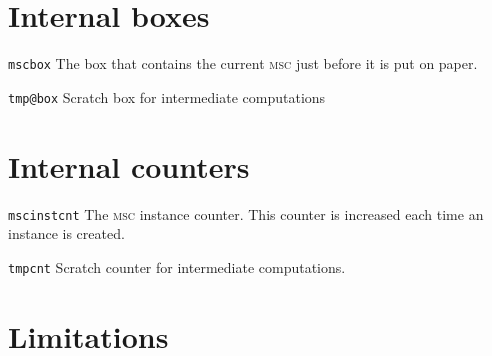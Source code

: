 \documentclass[a4paper]{article}
\newcommand{\cmd}[1]{\texttt{\bslash #1}}
\newcommand{\acro}[1]{{\scshape\lowercase{#1}}}
\newcommand\MSC{\acro{MSC}}
\newenvironment{defs}{%
  \begin{list}{}%
              {\setlength{\labelwidth}{0pt}%
               \setlength{\labelsep}{1em}%
               \setlength{\leftmargin}{1em}%
               \setlength{\parsep}{1ex}%
               \setlength{\listparindent}{0pt}%
               \setlength{\rightmargin}{0pt}%
               \renewcommand{\makelabel}[1]{##1}%
               \raggedright%
              }%
  }{%
  \end{list}}
\begin{document}
\section{Internal boxes}

\begin{defs}

\item[\cmd{mscbox}]
The box that contains the current \MSC{} just before it is put on paper.

\item[\cmd{tmp@box}]
Scratch box for intermediate computations
\end{defs}


\section{Internal counters}

\begin{defs}
\item[\cmd{mscinstcnt}] The \MSC{} instance counter. This counter is
increased each time an instance is created.

\item[\cmd{tmpcnt}] Scratch counter for intermediate computations.

\end{defs}

\section{Limitations}
\end{document}
